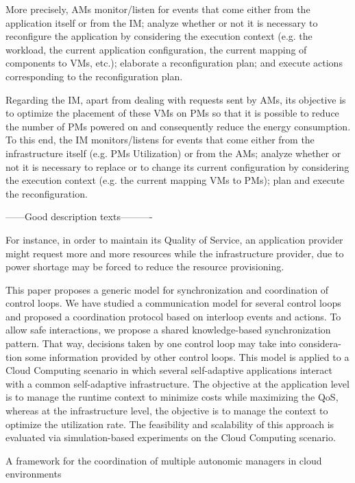 More precisely, AMs monitor/listen for events that come either from the application itself or from the IM; analyze whether or not it is necessary to reconfigure the application by considering the execution context (e.g. the workload, the current application configuration, the current mapping of components to VMs, etc.); elaborate a reconfiguration plan; and execute actions corresponding to the reconfiguration plan.

Regarding the IM, apart from dealing with requests sent by AMs, its objective is to optimize the placement of these VMs on PMs so that it is possible to reduce the number of PMs powered on and consequently reduce the energy
consumption. To this end, the IM monitors/listens for events that come either from the infrastructure itself (e.g. PMs Utilization) or from the AMs; analyze whether or not it is necessary to replace or to change its current configuration by considering the execution context (e.g. the current mapping VMs to PMs); plan and execute the reconfiguration.



------Good description texts----------


For instance, in order to maintain its Quality of Service, an application provider might request more and more resources while the infrastructure provider, due to power shortage may be forced to reduce the resource provisioning.

This paper proposes a generic model for synchronization and coordination of
control loops. We have studied a communication model for several control loops
and proposed a coordination protocol based on interloop events and actions. To
allow safe interactions, we propose a shared knowledge-based synchronization
pattern. That way, decisions taken by one control loop may take into considera-
tion some information provided by other control loops. This model is applied to
a Cloud Computing scenario in which several self-adaptive applications interact
with a common self-adaptive infrastructure. The objective at the application
level is to manage the runtime context to minimize costs while maximizing the
QoS, whereas at the infrastructure level, the objective is to manage the context
to optimize the utilization rate. The feasibility and scalability of this approach is
evaluated via simulation-based experiments on the Cloud Computing scenario.



A framework for the coordination of multiple autonomic managers in cloud environments

